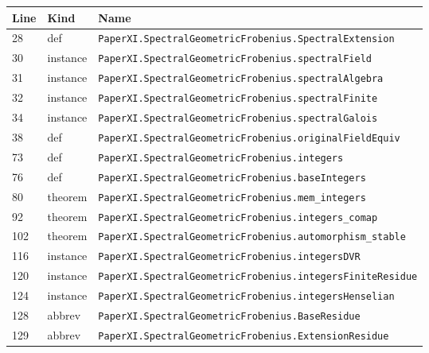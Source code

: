 \documentclass[10pt,oneside]{book}
\begin{document}
\begin{longtable}{@{}p{}p{}p{}@{}}\toprule Line&Kind&Name\\\midrule\endhead

28&def&\nolinkurl{PaperXI.SpectralGeometricFrobenius.SpectralExtension}\\

30&instance&\nolinkurl{PaperXI.SpectralGeometricFrobenius.spectralField}\\

31&instance&\nolinkurl{PaperXI.SpectralGeometricFrobenius.spectralAlgebra}\\

32&instance&\nolinkurl{PaperXI.SpectralGeometricFrobenius.spectralFinite}\\

34&instance&\nolinkurl{PaperXI.SpectralGeometricFrobenius.spectralGalois}\\

38&def&\nolinkurl{PaperXI.SpectralGeometricFrobenius.originalFieldEquiv}\\

73&def&\nolinkurl{PaperXI.SpectralGeometricFrobenius.integers}\\

76&def&\nolinkurl{PaperXI.SpectralGeometricFrobenius.baseIntegers}\\

80&theorem&\nolinkurl{PaperXI.SpectralGeometricFrobenius.mem_integers}\\

92&theorem&\nolinkurl{PaperXI.SpectralGeometricFrobenius.integers_comap}\\

102&theorem&\nolinkurl{PaperXI.SpectralGeometricFrobenius.automorphism_stable}\\

116&instance&\nolinkurl{PaperXI.SpectralGeometricFrobenius.integersDVR}\\

120&instance&\nolinkurl{PaperXI.SpectralGeometricFrobenius.integersFiniteResidue}\\

124&instance&\nolinkurl{PaperXI.SpectralGeometricFrobenius.integersHenselian}\\

128&abbrev&\nolinkurl{PaperXI.SpectralGeometricFrobenius.BaseResidue}\\

129&abbrev&\nolinkurl{PaperXI.SpectralGeometricFrobenius.ExtensionResidue}\\


\end{longtable}
\end{document}
